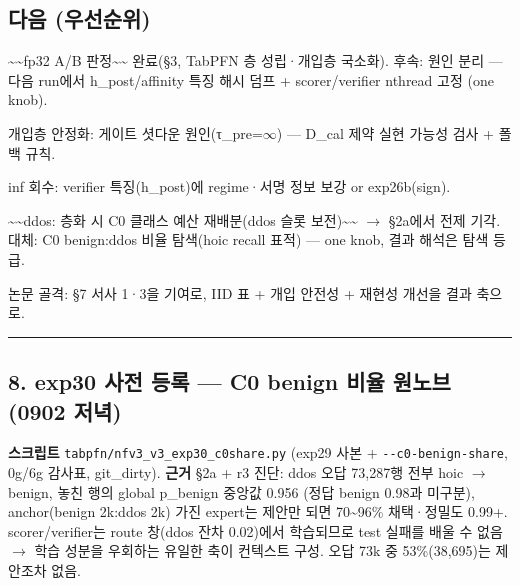\subsection{다음 (우선순위)}
\par\noindent \textbullet\enspace \textasciitilde{}\textasciitilde{}fp32 A/\allowbreak{}B 판정\textasciitilde{}\textasciitilde{} 완료(§3, TabPFN 층 성립·개입층 국소화). 후속: 원인 분리 — 다음 run에서 h\_\allowbreak{}post/\allowbreak{}affinity 특징 해시 덤프 +\allowbreak{} scorer/\allowbreak{}verifier nthread 고정 (one knob).


\par\noindent \textbullet\enspace 개입층 안정화: 게이트 셧다운 원인(τ\_\allowbreak{}pre=\allowbreak{}\ensuremath{\infty}) — D\_\allowbreak{}cal 제약 실현 가능성 검사 +\allowbreak{} 폴백 규칙.


\par\noindent \textbullet\enspace inf 회수: verifier 특징(h\_\allowbreak{}post)에 regime·서명 정보 보강 or exp26b(sign).


\par\noindent \textbullet\enspace \textasciitilde{}\textasciitilde{}ddos: 층화 시 C0 클래스 예산 재배분(ddos 슬롯 보전)\textasciitilde{}\textasciitilde{}  \ensuremath{\rightarrow}  §2a에서 전제 기각. 대체: C0 benign:ddos 비율 탐색(hoic recall 표적) — one knob, 결과 해석은 탐색 등급.


\par\noindent \textbullet\enspace 논문 골격: §7 서사 1·3을 기여로, IID 표 +\allowbreak{} 개입 안전성 +\allowbreak{} 재현성 개선을 결과 축으로.



\medskip\hrule\medskip
\subsection{8. exp30 사전 등록 — C0 benign 비율 원노브 (0902 저녁)}
\textbf{스크립트} \texttt{tabpfn/\allowbreak{}\allowbreak{}n\allowbreak{}fv3\_\allowbreak{}\allowbreak{}v3\_\allowbreak{}\allowbreak{}e\allowbreak{}xp30\_\allowbreak{}\allowbreak{}c0s\allowbreak{}hare.\allowbreak{}py} (exp29 사본 +\allowbreak{} \texttt{-\allowbreak{}-\allowbreak{}c0-\allowbreak{}ben\allowbreak{}ign-\allowbreak{}shar\allowbreak{}e}, 0g/\allowbreak{}6g 감사표, git\_\allowbreak{}dirty). \textbf{근거} §2a +\allowbreak{} r3 진단: ddos 오답 73,287행 전부 hoic \ensuremath{\rightarrow} benign, 놓친 행의 global p\_\allowbreak{}benign 중앙값 0.956 (정답 benign 0.98과 미구분), anchor(benign 2k:ddos 2k) 가진 expert는 제안만 되면 70\textasciitilde{}96\% 채택·정밀도 0.99+\allowbreak{}. scorer/\allowbreak{}verifier는 route 창(ddos 잔차 0.02)에서 학습되므로 test 실패를 배울 수 없음  \ensuremath{\rightarrow}  학습 성분을 우회하는 유일한 축이 컨텍스트 구성. 오답 73k 중 53\%(38,695)는 제안조차 없음.

